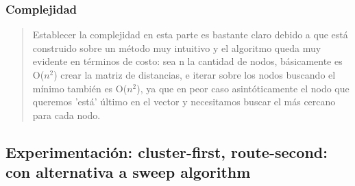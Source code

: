\documentclass[11pt,a4paper]{article}
\begin{document}
\subsubsection{Complejidad}
\begin{verse}
Establecer la complejidad en esta parte es bastante claro debido a que está construido sobre un método muy intuitivo y el algoritmo queda muy evidente en términos de costo: sea n la cantidad de nodos, básicamente es O($n^{2}$) crear la matriz de distancias, e iterar sobre los nodos buscando el mínimo también es O($n^{2}$), ya que en peor caso asintóticamente el nodo que queremos 'está' último en el vector y necesitamos buscar el más cercano para cada nodo.
\end{verse}


\subsection{Experimentación: cluster-first, route-second: con alternativa a sweep algorithm}
\end{document}
